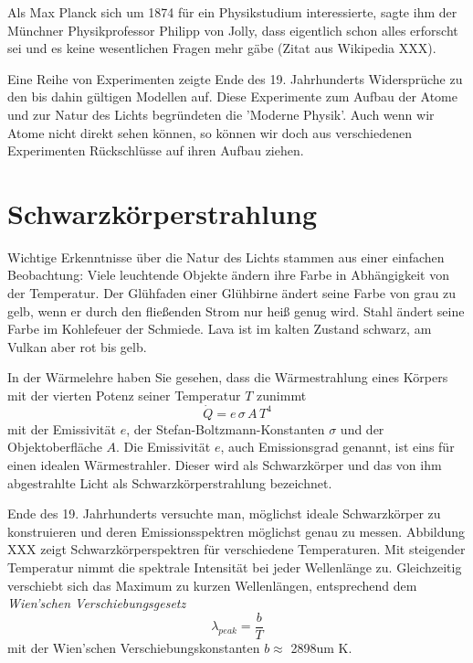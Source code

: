 Als Max Planck sich um 1874 für ein Physikstudium interessierte, sagte ihm der Münchner Physikprofessor Philipp von Jolly, dass eigentlich schon alles erforscht sei und es keine wesentlichen Fragen mehr gäbe (Zitat aus Wikipedia XXX).

Eine Reihe von Experimenten zeigte Ende des 19. Jahrhunderts Widersprüche zu den bis dahin gültigen Modellen auf. Diese Experimente zum Aufbau der Atome und zur Natur des Lichts begründeten die 'Moderne Physik'. Auch wenn wir Atome nicht direkt sehen können, so können wir doch aus verschiedenen Experimenten Rückschlüsse auf ihren Aufbau ziehen.

\section{Schwarzkörperstrahlung}

Wichtige Erkenntnisse über die Natur des Lichts stammen aus einer einfachen Beobachtung: Viele leuchtende Objekte ändern ihre Farbe in Abhängigkeit von der Temperatur. Der Glühfaden einer Glühbirne ändert seine Farbe von grau zu gelb, wenn er durch den fließenden Strom nur heiß genug wird. Stahl ändert seine Farbe im Kohlefeuer der Schmiede. Lava ist im kalten Zustand schwarz, am Vulkan aber rot bis gelb.

In der Wärmelehre haben Sie gesehen, dass die Wärmestrahlung eines Körpers mit der vierten Potenz seiner Temperatur $T$ zunimmt
\begin{equation}
    \dot{Q} = e \, \sigma \, A \, T^4
\end{equation}
mit der Emissivität $e$, der Stefan-Boltzmann-Konstanten $\sigma$ und der Objektoberfläche $A$. Die Emissivität $e$, auch Emissionsgrad genannt, ist eins für einen idealen Wärmestrahler. Dieser wird als Schwarzkörper und das von ihm abgestrahlte Licht als Schwarzkörperstrahlung bezeichnet.

Ende des 19. Jahrhunderts versuchte man, möglichst ideale Schwarzkörper zu konstruieren und deren Emissionsspektren möglichst genau zu messen. Abbildung XXX zeigt Schwarzkörperspektren für verschiedene Temperaturen. Mit steigender Temperatur nimmt die spektrale Intensität bei jeder Wellenlänge zu. Gleichzeitig verschiebt sich das Maximum zu kurzen Wellenlängen, entsprechend dem \emph{Wien'schen Verschiebungsgesetz}
\begin{equation}
    \lambda_{peak} = \frac{b}{T}
\end{equation}
mit der Wien'schen Verschiebungskonstanten $b \approx $ \si{2898}{um K}.

